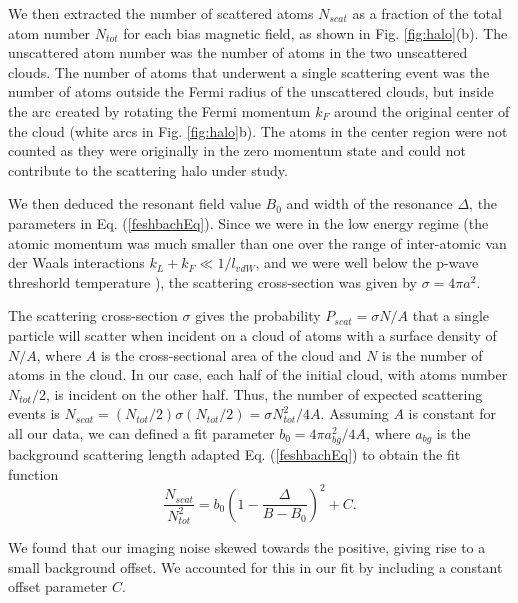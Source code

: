 \documentclass[12pt]{iopart}
\begin{document}
\par We then extracted the number of scattered atoms $N_{scat}$ as a fraction of the total atom number $N_{tot}$ for each bias magnetic field, as shown in Fig. \ref{fig:halo}(b). The unscattered atom number was the number of atoms in the two unscattered clouds. The number of atoms that underwent a single scattering event was the number of atoms outside the Fermi radius of the unscattered clouds, but inside the arc created by rotating the Fermi momentum $k_F$ around the original center of the cloud (white arcs in Fig. \ref{fig:halo}b). The atoms in the center region were not counted as they were originally in the zero momentum state and could not contribute to the scattering halo under study.
\par We then deduced the resonant field value $B_0$ and width of the resonance  $\Delta$, the parameters in Eq. (\ref{feshbachEq}).  Since we were in the low energy regime (the atomic momentum was much smaller than one over the range of inter-atomic van der Waals interactions $k_L+k_F\ll1/l_{vdW}$, and we were well below the p-wave threshorld temperature \cite{DeMarco99}), the scattering cross-section was given by $\sigma=4\pi a^2$.
\par The scattering cross-section $\sigma$ gives the probability $P_{scat}=\sigma N/A$ that a single particle will scatter when incident on a cloud of atoms with a surface density of $N/A$, where $A$ is the cross-sectional area of the cloud and $N$ is the number of atoms in the cloud. In our case, each half of the initial cloud, with atoms number $N_{tot}/2$, is incident on the other half. Thus, the number of expected scattering events is $N_{scat}= (N_{tot}/2) \sigma  (N_{tot}/2)=\sigma N_{tot}^2/4A$. Assuming $A$ is constant for all our data, we can defined a fit parameter $b_0=4\pi a_{bg}^2/4A$, where $a_{bg}$ is the background scattering length adapted Eq. (\ref{feshbachEq}) to obtain the fit function
\begin{equation}
\frac{N_{scat}}{N_{tot}^2}=b_0\left(1-\frac{\Delta}{B-B_0}\right)^2 + C.
\label{eq:fit}
\end{equation}
\par We found that our imaging noise skewed towards the positive, giving rise to a small background offset. We accounted for this in our fit by including a constant offset parameter $C$.
\end{document}

